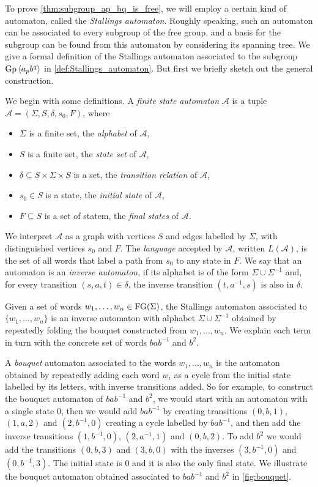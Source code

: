 To prove \cref{thm:subgroup_ap_bq_is_free}, we will employ a certain kind of automaton, called the
\emph{Stallings automaton}. Roughly speaking, such an automaton can be associated to every subgroup of the free group,
and a basis for the subgroup can be found from this automaton by considering its spanning tree.
We give a formal definition of the Stallings automaton associated to the subgroup $\textrm{Gp}\left\langle a_p b^q \right\rangle$ in
\cref{def:Stallings_automaton}. But first we briefly sketch out the general construction.

We begin with some definitions.
A \emph{finite state automaton} $\mathcal{A}$ is a tuple $\mathcal{A} = (\Sigma, S, \delta, s_0, F)$, where
\begin{itemize}
  \item $\Sigma$ is a finite set, the \emph{alphabet} of $\mathcal{A}$,
  \item $S$ is a finite set, the \emph{state set} of $\mathcal{A}$,
  \item $\delta \subseteq S \times \Sigma \times S$ is a set, the \emph{transition relation} of $\mathcal{A}$,
  \item $s_0 \in S$ is a state, the \emph{initial state} of $\mathcal{A}$,
  \item $F\subseteq S$ is a set of statem, the \emph{final states} of $\mathcal{A}$.
\end{itemize}
We interpret $\mathcal{A}$ as a graph with vertices $S$ and edges labelled by $\Sigma$, with distinguished vertices
$s_0$ and $F$. The \emph{language} accepted by $\mathcal{A}$, written $L(\mathcal{A})$, is the set of all words that
label a path from $s_0$ to any state in $F$.
We say that an automaton is an \emph{inverse automaton}, if its alphabet is of the form $\Sigma \cup \Sigma^{-1}$
and, for every transition $(s, a, t) \in \delta$, the inverse transition $(t, a^{-1}, s)$ is also in $\delta$.

Given a set of words $w_1, \ldots, w_n \in \textrm{FG}(\Sigma)$, the Stallings automaton associated to $\{w_1, \ldots, w_n\}$
is an inverse automaton with alphabet $\Sigma \cup \Sigma^{-1}$ obtained by repeatedly folding the
bouquet constructed from $w_1, \ldots, w_n$. We explain each term in turn with the concrete set of words $bab^{-1}$ and
$b^2$.

A \emph{bouquet} automaton associated to the words $w_1, \ldots, w_n$ is the automaton obtained by repeatedly adding
each word $w_i$ as a cycle from the initial state labelled by its letters, with inverse transitions added.
So for example, to construct the bouquet automaton of $bab^{-1}$ and $b^2$, we would start with an automaton with a
single state $0$, then we would add $bab^{-1}$ by creating transitions $(0, b, 1)$, $(1, a, 2)$ and $(2, b^{-1}, 0)$
creating a cycle labelled by $bab^{-1}$, and then add the inverse transitions $(1, b^{-1}, 0)$, $(2, a^{-1}, 1)$ and
$(0, b, 2)$. To add $b^2$ we would add the transitions $(0, b, 3)$ and $(3, b, 0)$ with the inverses $(3, b^{-1}, 0)$
and $(0, b^{-1}, 3)$. The initial state is $0$ and it is also the only final state.
We illustrate the bouquet automaton obtained associated to $bab^{-1}$ and $b^2$ in \cref{fig:bouquet}.

